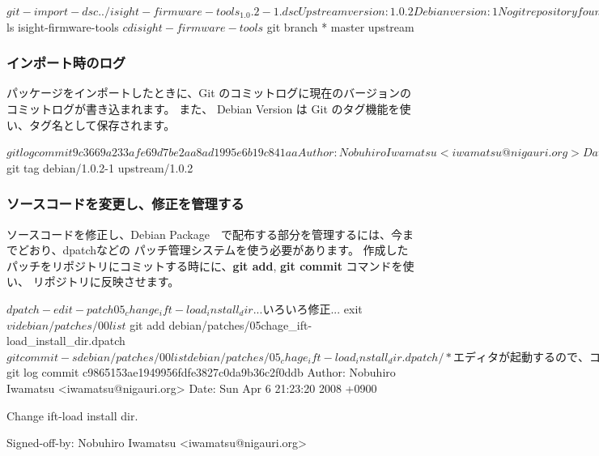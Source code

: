 \documentclass[mingoth,a4paper]{jsarticle}
\begin{document}
\begin{commandline}
$ git-import-dsc ../isight-firmware-tools_1.0.2-1.dsc
Upstream version: 1.0.2
Debian version: 1
No git repository found, creating one.
Initialized empty Git repository in .git/
Everything imported under isight-firmware-tools
$ ls
isight-firmware-tools
$ cd isight-firmware-tools
$ git branch
* master
  upstream
\end{commandline}

\subsubsection{インポート時のログ}

パッケージをインポートしたときに、Git のコミットログに現在のバージョンのコミットログが書き込まれます。
また、 Debian Version は Git のタグ機能を使い、タグ名として保存されます。

\begin{commandline}
$ git log
commit 9c3669a233afe69d7be2aa8ad1995e6b19c841aa
Author: Nobuhiro Iwamatsu <iwamatsu@nigauri.org>
Date:   Sun Apr 6 21:48:40 2008 +0900

    Imported Debian patch 1.0.2-1
$ git tag
debian/1.0.2-1
upstream/1.0.2
\end{commandline}

\subsubsection{ソースコードを変更し、修正を管理する}

ソースコードを修正し、Debian Package　で配布する部分を管理するには、今までどおり、dpatchなどの
パッチ管理システムを使う必要があります。
作成したパッチをリポジトリにコミットする時にに、{\bf git add}, {\bf git commit} コマンドを使い、
リポジトリに反映させます。

\begin{commandline}
$ dpatch-edit-patch 05_change_ift-load_install_dir
... いろいろ修正 ...
$ exit
$ vi debian/patches/00list
$ git add debian/patches/05chage_ift-load_install_dir.dpatch
$ git commit -s debian/patches/00list debian/patches/05_chage_ift-load_install_dir.dpatch
/* エディタが起動するので、コミットログを記述 */

Change ift-load install dir.
    
Signed-off-by: Nobuhiro Iwamatsu <iwamatsu@nigauri.org>

$ git log
commit c9865153ae1949956fdfe3827c0da9b36c2f0ddb
Author: Nobuhiro Iwamatsu <iwamatsu@nigauri.org>
Date:   Sun Apr 6 21:23:20 2008 +0900

    Change ift-load install dir.
    
    Signed-off-by: Nobuhiro Iwamatsu <iwamatsu@nigauri.org>
\end{commandline}
\end{document}
